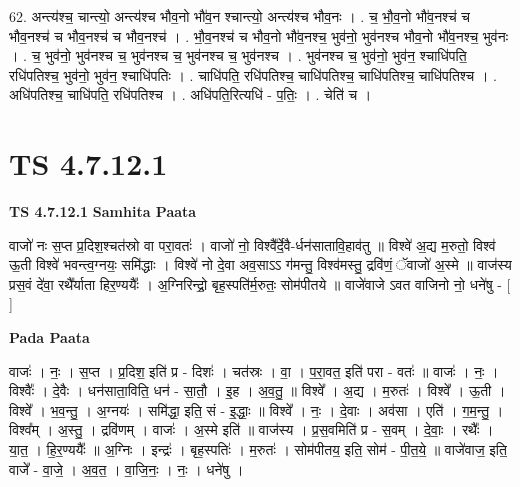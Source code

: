 \documentclass[17pt]{extarticle}
\begin{document}
62. अन्त्य॑श्च॒ चान्त्यो॒ अन्त्य॑श्च भौव॒नो भौ॑व॒न श्चान्त्यो॒ अन्त्य॑श्च भौव॒नः । . च॒ भौ॒व॒नो भौ॑व॒नश्च॑ च भौव॒नश्च॑ च भौव॒नश्च॑ च भौव॒नश्च॑ । . भौ॒व॒नश्च॑ च भौव॒नो भौ॑व॒नश्च॒ भुव॑नो॒ भुव॑नश्च भौव॒नो भौ॑व॒नश्च॒ भुव॑नः । . च॒ भुव॑नो॒ भुव॑नश्च च॒ भुव॑नश्च च॒ भुव॑नश्च च॒ भुव॑नश्च । . भुव॑नश्च च॒ भुव॑नो॒ भुव॑न॒ श्चाधि॑पति॒ रधि॑पतिश्च॒ भुव॑नो॒ भुव॑न॒ श्चाधि॑पतिः । . चाधि॑पति॒ रधि॑पतिश्च॒ चाधि॑पतिश्च॒ चाधि॑पतिश्च॒ चाधि॑पतिश्च । . अधि॑पतिश्च॒ चाधि॑पति॒ रधि॑पतिश्च । . अधि॑पति॒रित्यधि॑ - प॒तिः॒ । . चेति॑ च । \newline
\pagebreak
{}

\section{ TS 4.7.12.1 }

\textbf{TS 4.7.12.1 } \newline
\textbf{Samhita Paata} \newline

वाजो॑ नः स॒प्त प्र॒दिश॒श्चत॑स्रो वा परा॒वतः॑ । वाजो॑ नो॒ विश्वै᳚र्दे॒वै-र्धन॑सातावि॒हाव॑तु ॥ विश्वे॑ अ॒द्य म॒रुतो॒ विश्व॑ ऊ॒ती विश्वे॑ भवन्त्व॒ग्नयः॒ समि॑द्धाः । विश्वे॑ नो दे॒वा अव॒साऽऽ ग॑मन्तु॒ विश्व॑मस्तु॒ द्रवि॑णं॒ ॅवाजो॑ अ॒स्मे ॥ वाज॑स्य प्रस॒वं दे॑वा॒ रथै᳚र्याता हिर॒ण्ययैः᳚ । अ॒ग्निरिन्द्रो॒ बृह॒स्पति॑र्म॒रुतः॒ सोम॑पीतये ॥ वाजे॑वाजे ऽवत वाजिनो नो॒ धने॑षु - [  ] \newline

\textbf{Pada Paata} \newline

वाजः॑ । नः॒ । स॒प्त । प्र॒दिश॒ इति॑ प्र - दिशः॑ । चत॑स्रः । वा॒ । प॒रा॒वत॒ इति॑ परा - वतः॑ ॥ वाजः॑ । नः॒ । विश्वैः᳚ । दे॒वैः । धन॑साता॒विति॒ धन॑ - सा॒तौ॒ । इ॒ह । अ॒व॒तु॒ ॥ विश्वे᳚ । अ॒द्य । म॒रुतः॑ । विश्वे᳚ । ऊ॒ती । विश्वे᳚ । भ॒व॒न्तु॒ । अ॒ग्नयः॑ । समि॑द्धा॒ इति॒ सं - इ॒द्धाः॒ ॥ विश्वे᳚ । नः॒ । दे॒वाः । अव॑सा । एति॑ । ग॒म॒न्तु॒ । विश्व᳚म् । अ॒स्तु॒ । द्रवि॑णम् । वाजः॑ । अ॒स्मे इति॑ ॥ वाज॑स्य । प्र॒स॒वमिति॑ प्र - स॒वम् । दे॒वाः॒ । रथैः᳚ । या॒त॒ । हि॒र॒ण्ययैः᳚ ॥ अ॒ग्निः । इन्द्रः॑ । बृह॒स्पतिः॑ । म॒रुतः॑ । सोम॑पीतय॒ इति॒ सोम॑ - पी॒त॒ये॒ ॥ वाजे॑वाज॒ इति॒ वाजे᳚ - वा॒जे॒ । अ॒व॒त॒ । वा॒जि॒नः॒ । नः॒ । धने॑षु ।  \newline
\end{document}
